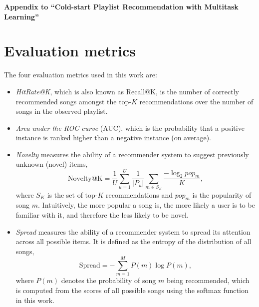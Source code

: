 \appendix
\begin{center}
  {\Large\bf Appendix to ``Cold-start Playlist Recommendation with Multitask Learning''}
\end{center}
\rule{0pt}{50pt}





\clearpage
\newpage

\section{Evaluation metrics}
The four evaluation metrics used in this work are:
\begin{itemize}
\item \emph{HitRate@K}, which is also known as Recall@K, is the number of correctly recommended songs amongst the top-$K$ recommendations over
      the number of songs in the observed playlist.
\item \emph{Area under the ROC curve} (AUC), which is the probability that a positive instance is ranked higher than a negative instance (on average).
\item \emph{Novelty} measures the ability of a recommender system to suggest previously unknown (\ie novel) items,
      $$
      \text{Novelty@K} = \frac{1}{U} \sum_{u=1}^U \frac{1}{|P_u|} \sum_{m \in S_K} \frac{-\log_2 pop_m}{K},
      $$
      where $S_K$ is the set of top-$K$ recommendations and $pop_m$ is the popularity of song $m$.
      Intuitively, the more popular a song is, the more likely a user is to be familiar with it, and therefore the less likely to be novel.
\item \emph{Spread} measures the ability of a recommender system to spread its attention across all possible items.
      It is defined as the entropy of the distribution of all songs,
      $$
      \text{Spread} = -\sum_{m=1}^M P(m) \log P(m),
      $$
      where $P(m)$ denotes the probability of song $m$ being recommended,
      which is computed from the scores of all possible songs using the softmax function in this work.
\end{itemize}


\clearpage
\newpage
\twocolumn


